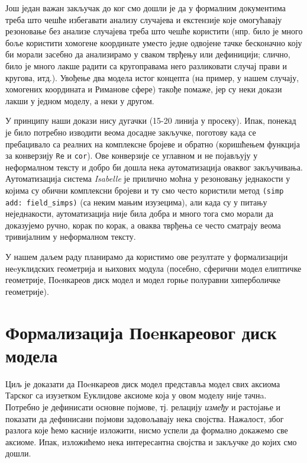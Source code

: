 Још један важан закључак до ког смо дошли је да у формалним
документима треба што чешће избегавати анализу случајева и екстензије
које омогућавају резоновање без анализе случајева треба што чешће
користити (нпр. било је много боље користити хомогене координате
уместо једне одвојене тачке бесконачно коју би морали засебно да
анализирамо у сваком тврђењу или дефиницији; слично, било је много
лакше радити са кругоправама него разликовати случај прави и кругова,
итд.). Увођење два модела истог концепта (на пример, у нашем случају,
хомогених координата и Риманове сфере) такође помаже, јер су неки
докази лакши у једном моделу, а неки у другом.

У принципу наши докази нису дугачки (15-20 линија у просеку). Ипак,
понекад је било потребно изводити веома досадне закључке, поготову
када се пребацивало са реалних на комплексне бројеве и обратно
(коришћењем функција за конверзију {\tt Re} и {\tt cor}). Ове
конверзије се углавном и не појављују у неформалном тексту и добро би
дошла нека аутоматизација оваквог закључивања. Аутоматизација система
\emph{Isabelle} је прилично моћна у резоновању једнакости у којима су
обични комплексни бројеви и ту смо често користили метод {\tt (simp
  add: field\_simps)} (са неким мањим изузецима), али када су у питању
неједнакости, аутоматизација није била добра и много тога смо морали
да доказујемо ручно, корак по корак, а оваква тврђења се често
сматрају веома тривијалним у неформалном тексту.

У нашем даљем раду планирамо да користимо ове резултате у
формализацији неeуклидских геометрија и њихових модула (посебно,
сферични модел елиптичке геометрије, Поeнкареов диск модел и модел
горње полуравни хиперболичке геометрије).



\section{Формализација Поeнкареовог диск модела}
\label{complex--poincare}

Циљ је доказати да Поeнкареов диск модел представља модел свих аксиома
Тарског са изузетком Еуклидове аксиоме која у овом моделу није
тачнa. Потребно је дефинисати основне појмове, тј. релацију
\emph{између} и растојање и показати да дефинисани појмови
задовољавају нека својства. Нажалост, због разлога које ћемо касније
изложити, нисмо успели да формално докажемо све аксиоме. Ипак,
изложићемо нека интересантна својства и закључке до којих смо дошли.

